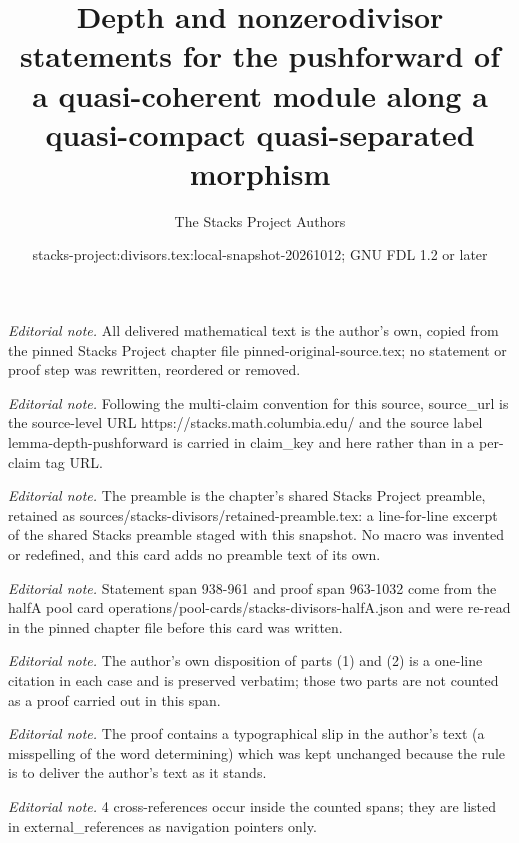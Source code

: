 \documentclass[10pt,a4paper]{amsart}
\title{Depth and nonzerodivisor statements for the pushforward of a quasi-coherent module along a quasi-compact quasi-separated morphism}
\author{The Stacks Project Authors}
\date{stacks-project:divisors.tex:local-snapshot-20261012; GNU FDL 1.2 or later}
\theoremstyle{plain}
\theoremstyle{definition}
\theoremstyle{remark}
\numberwithin{equation}{subsection}
\begin{document}
\maketitle
\noindent\textit{Editorial note.} All delivered mathematical text is the author's own, copied from the pinned Stacks Project chapter file pinned-original-source.tex; no statement or proof step was rewritten, reordered or removed.\par\medskip
\noindent\textit{Editorial note.} Following the multi-claim convention for this source, source\_url is the source-level URL https://stacks.math.columbia.edu/ and the source label lemma-depth-pushforward is carried in claim\_key and here rather than in a per-claim tag URL.\par\medskip
\noindent\textit{Editorial note.} The preamble is the chapter's shared Stacks Project preamble, retained as sources/stacks-divisors/retained-preamble.tex: a line-for-line excerpt of the shared Stacks preamble staged with this snapshot. No macro was invented or redefined, and this card adds no preamble text of its own.\par\medskip
\noindent\textit{Editorial note.} Statement span 938-961 and proof span 963-1032 come from the halfA pool card operations/pool-cards/stacks-divisors-halfA.json and were re-read in the pinned chapter file before this card was written.\par\medskip
\noindent\textit{Editorial note.} The author's own disposition of parts (1) and (2) is a one-line citation in each case and is preserved verbatim; those two parts are not counted as a proof carried out in this span.\par\medskip
\noindent\textit{Editorial note.} The proof contains a typographical slip in the author's text (a misspelling of the word determining) which was kept unchanged because the rule is to deliver the author's text as it stands.\par\medskip
\noindent\textit{Editorial note.} 4 cross-references occur inside the counted spans; they are listed in external\_references as navigation pointers only.\par\medskip
\end{document}

